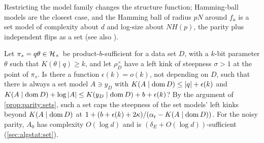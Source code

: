 \begin{remark}\label{rem:algstat:restricted}
Restricting the model family changes the structure function; Hamming-ball models \citep{vereshchagin2010rate} are the closest case, and the Hamming ball of radius $pN$ around $f_a$ is a set model of complexity about $d$ and log-size about $NH(p)$, the parity plus independent flips as a set (see also \citealp{milovanov2016algorithmic}).
\end{remark}

\begin{question}\label{q:parity:open}
Let $\pi_s=q\theta\in\mathcal{H}_{\times}$ be product-$b$-sufficient for a data set $D$, with a $k$-bit parameter $\theta$ such that $K(\theta\mid q)\ge k$, and let $\rho^\times_D$ have a left kink of steepness $\sigma>1$ at the point of $\pi_s$. Is there a function $\epsilon(k)=o(k)$, not depending on $D$, such that there is always a set model $A\ni y_D$ with $K(A\mid\operatorname{dom} D)\le|q|+\epsilon(k)$ and $K(A\mid\operatorname{dom} D)+\log|A|\le K(y_D\mid\operatorname{dom} D)+b+\epsilon(k)$? By the argument of \cref{prop:parity:sets}, such a set caps the steepness of the set models' left kinks beyond $K(A\mid\operatorname{dom} D)$ at $1+(b+\epsilon(k)+2\kappa)/(\alpha_{\rm r}-K(A\mid\operatorname{dom} D))$. For the noisy parity, $A_0$ has complexity $O(\log d)$ and is $(\delta_E+O(\log d))$-sufficient (\cref{sec:algstat:set}).
\end{question}
